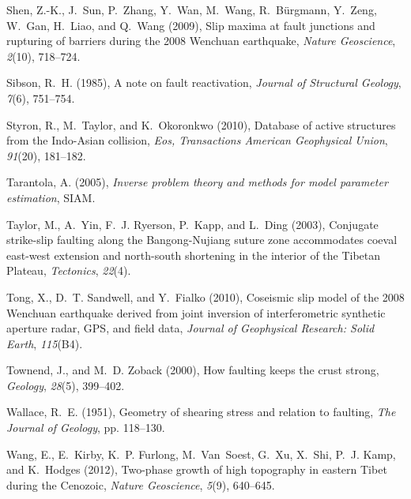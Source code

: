 \documentclass[twocolumn,jgrga]{AGUTeX}
\begin{document}
\begin{article}
{{{\begin{thebibliography}{89}
Shen, Z.-K., J.~Sun, P.~Zhang, Y.~Wan, M.~Wang, R.~B{\"u}rgmann, Y.~Zeng,
  W.~Gan, H.~Liao, and Q.~Wang (2009), Slip maxima at fault junctions and
  rupturing of barriers during the 2008 {W}enchuan earthquake, \textit{Nature
  Geoscience}, \textit{2}(10), 718--724.

Sibson, R.~H. (1985), A note on fault reactivation, \textit{Journal of
  Structural Geology}, \textit{7}(6), 751--754.

Styron, R., M.~Taylor, and K.~Okoronkwo (2010), Database of active structures
  from the {I}ndo-{A}sian collision, \textit{Eos, Transactions American
  Geophysical Union}, \textit{91}(20), 181--182.

Tarantola, A. (2005), \textit{Inverse problem theory and methods for model
  parameter estimation}, SIAM.

Taylor, M., A.~Yin, F.~J. Ryerson, P.~Kapp, and L.~Ding (2003), Conjugate
  strike-slip faulting along the {B}angong-{N}ujiang suture zone accommodates
  coeval east-west extension and north-south shortening in the interior of the
  {T}ibetan {P}lateau, \textit{Tectonics}, \textit{22}(4).

Tong, X., D.~T. Sandwell, and Y.~Fialko (2010), Coseismic slip model of the
  2008 {W}enchuan earthquake derived from joint inversion of interferometric
  synthetic aperture radar, {G}{P}{S}, and field data, \textit{Journal of
  Geophysical Research: Solid Earth}, \textit{115}(B4).

Townend, J., and M.~D. Zoback (2000), How faulting keeps the crust strong,
  \textit{Geology}, \textit{28}(5), 399--402.

Wallace, R.~E. (1951), Geometry of shearing stress and relation to faulting,
  \textit{The Journal of Geology}, pp. 118--130.

Wang, E., E.~Kirby, K.~P. Furlong, M.~Van~Soest, G.~Xu, X.~Shi, P.~J. Kamp, and
  K.~Hodges (2012), Two-phase growth of high topography in eastern {T}ibet
  during the {C}enozoic, \textit{Nature Geoscience}, \textit{5}(9), 640--645.


\end{thebibliography}}}}
\end{article}
\end{document}
